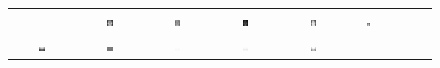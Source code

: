 \documentclass[a4paper,10pt]{article}
\begin{document}
\begin{figure}
\begin{tabular}{ccccccccc}
&
\includegraphics[width=0.1055\textwidth]{images/lumbar1_lime}\!\!\!\!\!\!
&
\includegraphics[width=0.1055\textwidth]{images/lumbar1_msr}\!\!\!\!\!\!
&
\includegraphics[width=0.1055\textwidth]{images/lumbar1_N4}\!\!\!\!\!\!
&
\includegraphics[width=0.1055\textwidth]{images/lumbar1_pie}\!\!\!\!\!\!
&
\includegraphics[width=0.1055\textwidth]{images/lumbar1_srie}%
\\
\includegraphics[width=0.1055\textwidth]{images/camels_gray}\!\!\!\!\!\!
&
\includegraphics[width=0.1055\textwidth]{images/camels_dgkv}\!\!\!\!\!\!
&
\includegraphics[width=0.1055\textwidth]{images/camels_star}\!\!\!\!\!\!
&
\includegraphics[width=0.1055\textwidth]{images/camels_jiep}\!\!\!\!\!\!
&
\includegraphics[width=0.1055\textwidth]{images/camels_lime}\!\!\!\!\!\!

\end{tabular}
\end{figure}
\end{document}
